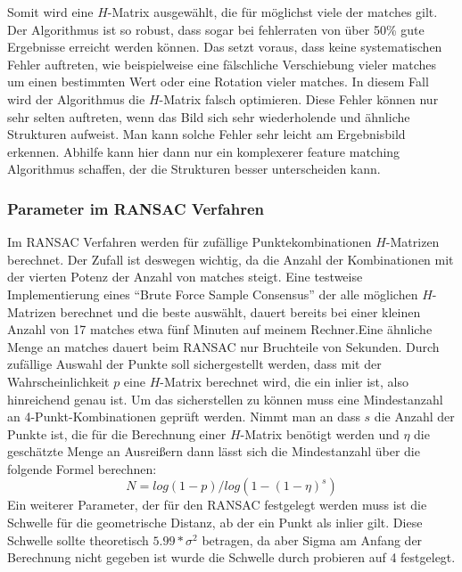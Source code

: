 Somit wird eine $H$-Matrix ausgewählt, die für möglichst viele der matches gilt. Der Algorithmus ist so robust, dass sogar bei fehlerraten von über 50\% gute Ergebnisse erreicht werden können. Das setzt voraus, dass keine systematischen Fehler auftreten, wie beispielweise eine fälschliche Verschiebung vieler matches um einen bestimmten Wert oder eine Rotation vieler matches. In diesem Fall wird der Algorithmus die $H$-Matrix falsch optimieren. Diese Fehler können nur sehr selten auftreten, wenn das Bild sich sehr wiederholende und ähnliche Strukturen aufweist. Man kann solche Fehler sehr leicht am Ergebnisbild erkennen. Abhilfe kann hier dann nur ein komplexerer feature matching Algorithmus schaffen, der die Strukturen besser unterscheiden kann.

\subsubsection{Parameter im RANSAC Verfahren}
Im RANSAC Verfahren werden für zufällige Punktekombinationen $H$-Matrizen berechnet. Der Zufall ist deswegen wichtig, da die Anzahl der Kombinationen mit der vierten Potenz der Anzahl von matches steigt. Eine testweise Implementierung eines “Brute Force Sample Consensus” der alle möglichen $H$-Matrizen berechnet und die beste auswählt, dauert bereits bei einer kleinen Anzahl von 17 matches etwa fünf Minuten auf meinem Rechner.Eine ähnliche Menge an matches dauert beim RANSAC nur Bruchteile von Sekunden. Durch zufällige Auswahl der Punkte soll sichergestellt werden, dass mit der  Wahrscheinlichkeit $p$ eine $H$-Matrix berechnet wird, die ein inlier ist, also hinreichend genau ist. Um das sicherstellen zu können muss eine Mindestanzahl an 4-Punkt-Kombinationen geprüft werden. Nimmt man an dass $s$ die Anzahl der Punkte ist, die für die Berechnung einer $H$-Matrix benötigt werden und $\eta$ die geschätzte Menge an Ausreißern dann lässt sich die Mindestanzahl über die folgende Formel berechnen:
$$N=log(1-p)/log(1-(1-\eta)^s)$$
Ein weiterer Parameter, der für den RANSAC festgelegt werden muss ist die Schwelle für die geometrische Distanz, ab der ein Punkt als inlier gilt. Diese Schwelle sollte theoretisch $5.99*\sigma ^2$ betragen, da aber Sigma am Anfang der Berechnung nicht gegeben ist wurde die Schwelle durch probieren auf 4 festgelegt.

